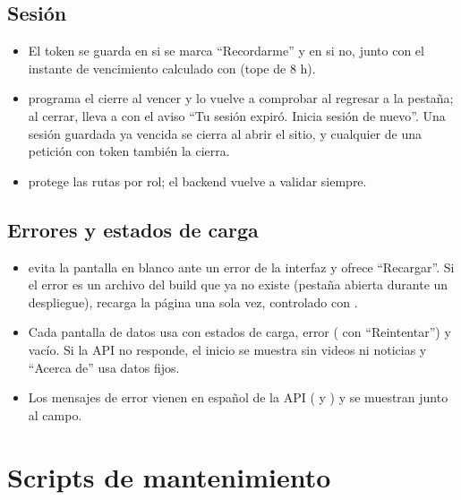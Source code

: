 \documentclass[11pt,a4paper]{article}
\begin{document}
\subsection{Sesi\'on}
\begin{itemize}
  \item El token se guarda en  si se marca ``Recordarme'' y en  si no, junto con
    el instante de vencimiento calculado con  (tope de 8 h).
  \item {} programa el cierre al vencer y lo vuelve a comprobar al regresar a la pesta\~na; al cerrar,
    lleva a  con el aviso ``Tu sesi\'on expir\'o. Inicia sesi\'on de nuevo''. Una sesi\'on guardada ya
    vencida se cierra al abrir el sitio, y cualquier  de una petici\'on con token tambi\'en la cierra.
  \item {} protege las rutas por rol; el backend vuelve a validar siempre.
\end{itemize}

\subsection{Errores y estados de carga}
\begin{itemize}
  \item {} evita la pantalla en blanco ante un error de la interfaz y ofrece ``Recargar''. Si el error
    es un archivo del build que ya no existe (pesta\~na abierta durante un despliegue), recarga la p\'agina una sola vez,
    controlado con .
  \item Cada pantalla de datos usa  con estados de carga, error ( con ``Reintentar'') y
    vac\'io. Si la API no responde, el inicio se muestra sin videos ni noticias y ``Acerca de'' usa datos fijos.
  \item Los mensajes de error vienen en espa\~nol de la API ( y ) y se muestran junto al campo.
\end{itemize}

\section{Scripts de mantenimiento}
\end{document}
